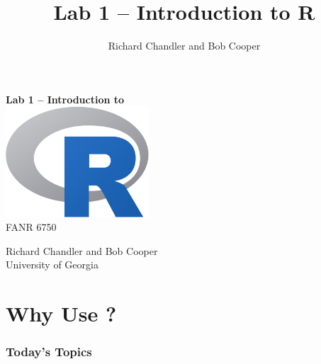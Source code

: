 \documentclass[color=usenames,dvipsnames]{beamer}\usepackage[]{graphicx}\usepackage[]{color}
\title{Lab 1 -- Introduction to {\bf R}}
\author{Richard Chandler and Bob Cooper}
\begin{document}



\begin{frame}[plain]
  \LARGE
  {\centering
  {\huge \bf Lab 1 -- Introduction to \R} \\
  \vspace{0.9cm}
  \includegraphics[width=0.4\textwidth]{figs/Rlogo} \\
  \vspace{0.5cm}
  FANR 6750 \par
  \vfill
  \large
  Richard Chandler and Bob Cooper \\
  University of Georgia \\
  }
\end{frame}




\section{Why Use \R?}


\begin{frame}[plain]
  \frametitle{Today's Topics}
  \Large
\end{frame}
\end{document}
